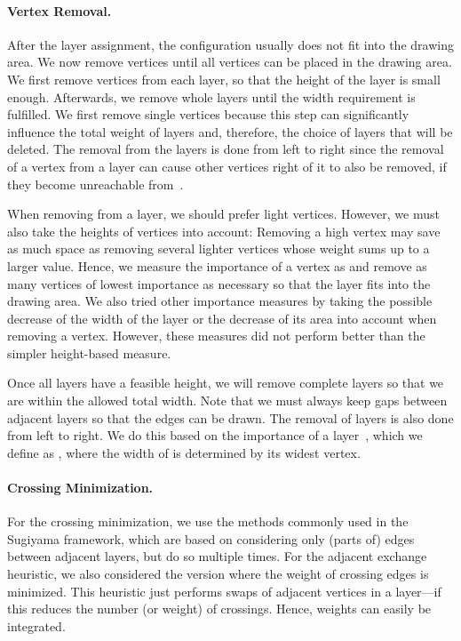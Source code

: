 \documentclass[]{llncs}
\begin{document}
\paragraph{Vertex Removal.}
After the layer assignment, the configuration usually
does not fit into the drawing area. We now
remove vertices until all vertices can be placed in the drawing area.
We first remove vertices from each layer, so that the
height of the layer is small enough. Afterwards, we remove whole
layers until the width requirement is fulfilled. We first remove
single vertices because this step can significantly influence the
total weight of layers and, therefore, the choice of layers that will
be deleted. The removal from the layers is done from left to right
since the removal of a vertex from a layer can cause other vertices
right of it to also be removed, if they become unreachable
from~.

When removing from a layer, we should prefer light
vertices. However, we must also take the heights of vertices into
account: Removing a high vertex may save as much space as removing
several lighter vertices whose weight sums up to a larger value.
Hence, we measure the importance of a vertex  as  and remove as many vertices of lowest importance as
necessary so that the layer fits into the drawing area. We also
tried other importance measures by taking the possible decrease
of the width of the layer or the decrease of its area into account
when removing a vertex. However, these measures did not perform
better than the simpler height-based measure.

Once all layers have a feasible height, we will remove complete
layers so that we are within the allowed total width. Note that we
must always keep gaps between adjacent layers so that the edges can be
drawn. The removal of layers is also done from left to right.
We do this based on the importance of a layer~, which we define as
, where the
width of  is determined by its widest vertex.

\paragraph{Crossing Minimization.}
For the crossing minimization, we use the methods commonly used in
the Sugiyama framework, which are based on considering only (parts of)
edges between adjacent layers, but do so multiple times.
For the adjacent exchange heuristic, we also
considered the version where the weight of crossing edges is
minimized. This heuristic just performs swaps of adjacent vertices
in a layer---if this reduces the number (or weight) of
crossings. Hence, weights can easily be integrated.
\end{document}
